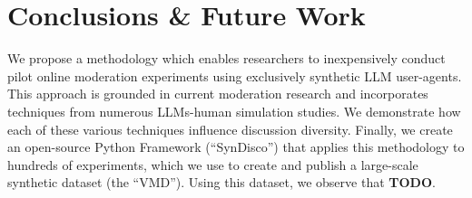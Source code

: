 %
\section{Conclusions \& Future Work}

We propose a methodology which enables researchers to inexpensively conduct pilot online moderation experiments using exclusively synthetic \ac{LLM} user-agents. This approach is grounded in current moderation research and incorporates techniques from numerous \acp{LLM}-human simulation studies. We demonstrate how each of these various techniques influence discussion diversity. Finally, we create an open-source Python Framework (“SynDisco”) that applies this methodology to hundreds of experiments, which we use to create and publish a large-scale synthetic dataset (the “\acf{VMD}”). Using this dataset, we observe that \textbf{TODO}.
